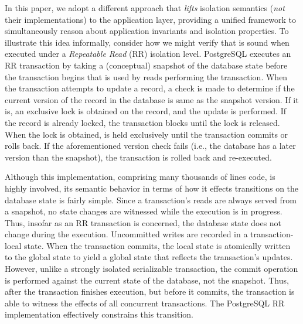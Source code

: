 In this paper, we adopt a different approach that \emph{lifts}
isolation semantics (\emph{not} their implementations) to the
application layer, providing a unified framework to simultaneously
reason about application invariants and isolation properties.  To
illustrate this idea informally, consider how we might verify that
 is sound when executed under a \emph{Repeatable Read}
(RR) isolation level.  PostgreSQL executes an RR transaction by taking
a (conceptual) snapshot of the database state before the transaction
begins that is used by reads performing the transaction.  When the
transaction attempts to update a record, a check is made to determine
if the current version of the record in the database is same as the
snapshot version. If it is, an exclusive lock is obtained on the
record, and the update is performed. If the record is already locked,
the transaction blocks until the lock is released.  When the lock is
obtained, is held exclusively until the transaction commits or rolls
back. If the aforementioned version check fails (i.e., the database
has a later version than the snapshot), the transaction is rolled back
and re-executed.

Although this implementation, comprising many thousands of lines code,
is highly involved, its semantic behavior in terms of how it effects
transitions on the database state is fairly simple.  Since a
transaction's reads are always served from a snapshot, no state
changes are witnessed while the execution is in progress. Thus,
insofar as an RR transaction is concerned, the database state does not
change during the execution.  Uncommitted writes are recorded in a
transaction-local state.  When the transaction commits, the local
state is atomically written to the global state to yield a global
state that reflects the transaction's updates.  However, unlike a
strongly isolated serializable transaction, the commit operation is
performed against the current state of the database, not the
snapshot. Thus, after the transaction finishes execution, but before
it commits, the transaction is able to witness the effects of all
concurrent transactions.  The PostgreSQL RR implementation effectively
constrains this transition.

